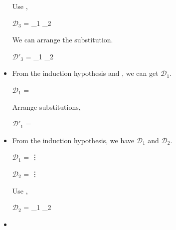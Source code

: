 \begin{itemize}
	      Use \KAbs,
	      	      	      	      	      
	      $\mathcal{D}_3$ = 
	      {_1 \andalso {}_2}
	      	      	      	      	      
	      We can arrange the substitution.
	      	      	      	      	      
	      $\mathcal{D}'_3$ = 
	      {_1 \andalso {}_2}
	      	      	      	      	      
	\item \KApp
	      	      	      	      	      
	      From the induction hypothesis and \KApp, we can get $\mathcal{D}_1$.
	      	      	      	      	      
	      $\mathcal{D}_1$ = 
	      { \andalso {}}
	      	      	      	      	      
	      Arrange substitutions,
	      	      	      	      	      
	      $\mathcal{D}'_1$ = 
	      { \andalso {}}
	      	      	      	      	      
	\item \KConv
	      	      	      	      	      
	      From the induction hypothesis, we have $\mathcal{D}_1$ and $\mathcal{D}_2$.
	      	      	      	      	      
	      $\mathcal{D}_1$ = 
	      {\vdots}
	      	      	      	      	      
	      $\mathcal{D}_2$ = 
	      {\vdots}
	      	      	      	      	      
	      Use \KConv,
	      	      	      	      	      
	      $\mathcal{D}_2$ = 
	      {_1 \andalso {}_2}
	      	      	      	      	      
	\item \KTW
	      	      	      	      	      

\end{itemize}
